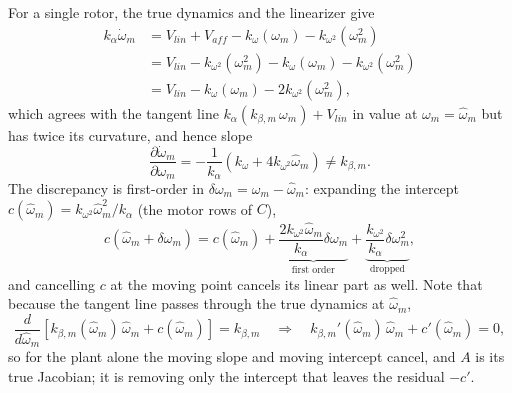 \documentclass{article}
\begin{document}
For a single rotor, the true dynamics and the linearizer give
\begin{equation}
\begin{aligned}
    k_\alpha \dot{\omega}_m &= V_{lin} + V_{aff} - k_\omega(\omega_m) - k_{\omega^2}(\omega_m^2)\\
    &= V_{lin} - k_{\omega^2}(\omega_m^2) - k_\omega(\omega_m) - k_{\omega^2}(\omega_m^2)\\
    &= V_{lin} - k_\omega(\omega_m) - 2k_{\omega^2}(\omega_m^2),
\end{aligned}
\end{equation}
which agrees with the tangent line $k_\alpha(k_{\beta,m}\,\omega_m) + V_{lin}$ in value at $\omega_m = \widehat{\omega}_m$ but has twice its curvature, and hence slope
\begin{equation}
    \frac{\partial \dot{\omega}_m}{\partial \omega_m} = -\frac{1}{k_\alpha}\left(k_\omega + 4k_{\omega^2}\widehat{\omega}_m\right) \neq k_{\beta, m}.
\end{equation}
The discrepancy is first-order in $\delta\omega_m = \omega_m - \widehat{\omega}_m$: expanding the intercept $c(\widehat{\omega}_m) = k_{\omega^2}\widehat{\omega}_m^2 / k_\alpha$ (the motor rows of $C$),
\begin{equation}
    c(\widehat{\omega}_m + \delta\omega_m) = c(\widehat{\omega}_m) + \underbrace{\frac{2k_{\omega^2}\widehat{\omega}_m}{k_\alpha}\delta\omega_m}_{\text{first order}} + \underbrace{\frac{k_{\omega^2}}{k_\alpha}\delta\omega_m^2}_{\text{dropped}},
\end{equation}
and cancelling $c$ at the moving point cancels its linear part as well.  Note that because the tangent line passes through the true dynamics at $\widehat{\omega}_m$,
\begin{equation}
    \frac{d}{d\widehat{\omega}_m}\left[k_{\beta,m}(\widehat{\omega}_m)\,\widehat{\omega}_m + c(\widehat{\omega}_m)\right] = k_{\beta, m}
    \quad\Longrightarrow\quad
    k_{\beta,m}'(\widehat{\omega}_m)\,\widehat{\omega}_m + c'(\widehat{\omega}_m) = 0,
\end{equation}
so for the plant alone the moving slope and moving intercept cancel, and $A$ is its true Jacobian; it is removing only the intercept that leaves the residual $-c'$.
\end{document}
